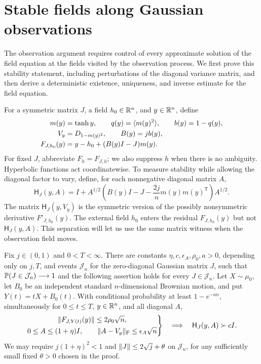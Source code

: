 \section{Stable fields along Gaussian observations}
\label{sec:stability}

The observation argument requires control of every approximate solution
of the field equation at the fields visited by the observation process.
We first prove this stability statement, including perturbations of the
diagonal variance matrix, and then derive a deterministic existence,
uniqueness, and inverse estimate for the field equation.

For a symmetric matrix $J$, a field $h_0\in\mathbb R^n$, and $y\in\mathbb R^n$, define
\begin{equation}
 \begin{split}
 m(y)&=\tanh y,\qquad q(y)=\langle m(y)^2\rangle,\qquad
 b(y)=1-q(y),\\
 V_y&=D_{1-m(y)^2},\qquad B(y)=jb(y),\\
 F_{J,h_0}(y)&=y-h_0+(B(y)I-J)m(y).
 \end{split}
 \label{eq:field-map}
\end{equation}
For fixed $J$, abbreviate $F_h=F_{J,h}$; we also suppress $h$ when
there is no ambiguity. Hyperbolic functions act coordinatewise. To measure
stability while allowing the diagonal factor to vary, define, for each
nonnegative diagonal matrix $A$,
\begin{equation}
 \mathsf H_J(y,A)
 =I+A^{1/2}\left(B(y)I-J-\frac{2j}{n}m(y)m(y)^{\mathsf T}\right)A^{1/2}.
 \label{eq:field-hessian}
\end{equation}
The matrix $\mathsf H_J(y,V_y)$ is the symmetric version of the
possibly nonsymmetric derivative $F'_{J,h_0}(y)$. The external field
$h_0$ enters the residual $F_{J,h_0}(y)$ but not
$\mathsf H_J(y,A)$. This separation will let us use the same matrix
witness when the observation field moves.

\begin{proposition}
\label{prop:stable-fields}
Fix $j\in(0,1)$ and $0<T<\infty$.  There are constants
$\eta,c,\epsilon_A,\rho_0,a>0$, depending only on $j,T$, and events
$\mathcal J_n$ for the zero-diagonal Gaussian matrix $J$, such that
$\mathbb P(J\in\mathcal J_n)\longrightarrow1$ and the following assertion
holds for every $J\in\mathcal J_n$.  Let $X\sim\mu_0$, let $B_0$ be an
independent standard $n$-dimensional Brownian motion, and put
$Y(t)=tX+B_0(t)$.  With conditional probability at least $1-e^{-an}$,
simultaneously for $0\le t\le T$, $y\in\mathbb R^n$, and all diagonal $A$,
\begin{equation}
 \left.
 \begin{gathered}
 \lVert F_{J,Y(t)}(y)\rVert\le2\rho_0\sqrt n,\\
 0\le A\le(1+\eta)I,\qquad
 \lVert A-V_y\rVert_{\mathrm F}\le\epsilon_A\sqrt n
 \end{gathered}
 \right\}
 \quad\Longrightarrow\quad
 \mathsf H_J(y,A)\succ cI.
 \label{eq:stable-field}
\end{equation}
We may require $j(1+\eta)^2<1$ and
$\lVert J\rVert\le2\sqrt j+\theta$ on $\mathcal J_n$, for any sufficiently
small fixed $\theta>0$ chosen in the proof.
\end{proposition}

